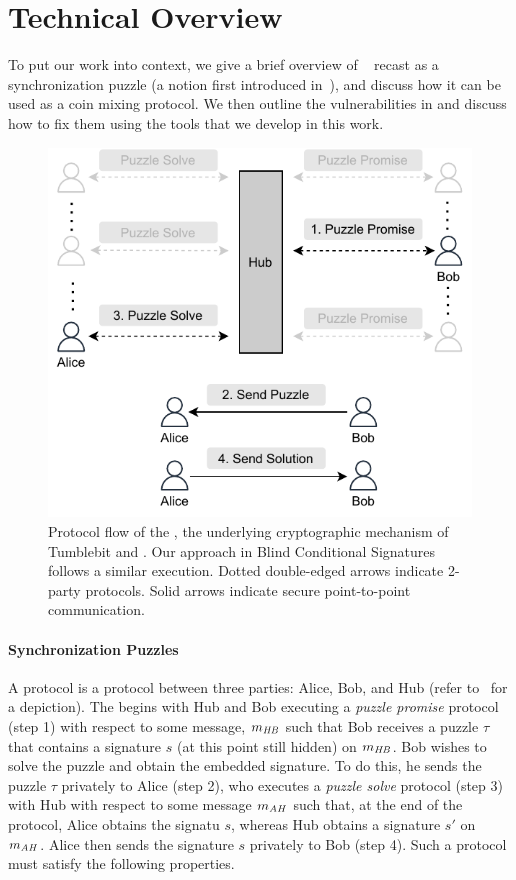 \section{Technical Overview}

To put our work into context, we give a brief overview of \aal~\cite{SP:TaiMorMaf21} recast as a synchronization puzzle (a notion first introduced in~\cite{NDSS:HABSG17}), and discuss how it can be used as a coin mixing protocol. We then outline the vulnerabilities in \aal and discuss how to fix them using the tools that we develop in this work.

\begin{figure}[tbh]
    \centering
    \includegraphics{bcs/figs/bcs.pdf}
    \caption{Protocol flow of the \syncpuzzle, the underlying cryptographic mechanism of Tumblebit and \aal. Our approach in Blind Conditional Signatures follows a similar execution. Dotted double-edged arrows indicate 2-party protocols. Solid arrows indicate secure point-to-point communication.}
    \label{fig:sync_tool}
\end{figure}

\paragraph{Synchronization Puzzles} A \syncpuzzle protocol is a protocol between three parties: Alice, Bob, and Hub (refer to~ for a depiction). The \syncpuzzle begins with Hub and Bob executing a \emph{puzzle promise} protocol (step 1) with respect to some message, $m_{\mathit{HB}}$ such that Bob receives a puzzle $\tau$ that contains a signature $s$ (at this point still hidden) on $m_{\mathit{HB}}$. Bob wishes to solve the puzzle and obtain the embedded signature. To do this, he sends the puzzle $\tau$ privately to Alice (step 2), who executes a \emph{puzzle solve} protocol (step 3) with Hub with respect to some message $m_{\mathit{AH}}$ such that, at the end of the protocol, Alice obtains the signatu $s$, whereas Hub obtains a signature $s'$ on $m_{\mathit{AH}}$.
Alice then sends the signature $s$ privately to Bob (step 4). Such a protocol must satisfy the following properties.

